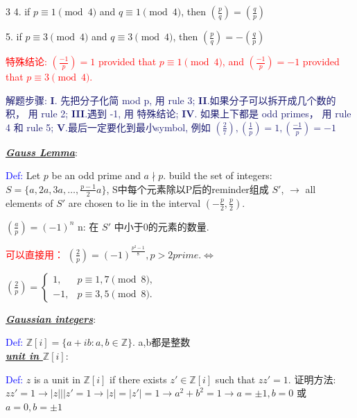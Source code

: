 \documentclass[12pt]{article}
\newcommand{\bulletPoint}[1]{\underline{\textit{\textbf{#1}}}}
\begin{document}
\begin{multicols*}{3}
\textcolor{magenta!90!black}
{4. if $p \equiv 1 \pmod{4}$ and $q \equiv 1 \pmod{4}$, then $\left(\frac{p}{q}\right)=\left(\frac{q}{p}\right)$}

\textcolor{magenta!90!black}
{5. if $p \equiv 3 \pmod{4}$ and $q \equiv 3 \pmod{4}$, then $\left(\frac{p}{q}\right)=-\left(\frac{q}{p}\right)$}

\textcolor{red}{特殊结论: $(\frac{-1}{p})=1$ provided that $p\equiv 1 \pmod{4}$, 
and $(\frac{-1}{p})=-1$ provided that $p\equiv 3 \pmod{4}$.}

{\fontsize{5.5pt}{5pt}\selectfont\textcolor{MidnightBlue}
{解题步骤: \textbf{I}. 先把分子化简 mod p, 用 rule 3;
\textbf{II}.如果分子可以拆开成几个数的积， 用 rule 2;
\textbf{III}.遇到 -1, 用 特殊结论; \textbf{IV}. 如果上下都是 odd primes， 用 rule 4 和 rule 5;
\textbf{V}.最后一定要化到最小symbol, 例如 $(\frac{2}{7}),(\frac{1}{p})=1, (\frac{-1}{p})=-1$}}






\bulletPoint{Gauss Lemma}:

\textcolor{blue}{Def:} Let $p$ be an odd prime and $a \nmid p$. build the set of integers:
$S=\{a, 2a, 3a, \ldots, \frac{p-1}{2}a\}$, S中每个元素除以P后的reminder组成 $S'$,
 $\rightarrow$ all elements of $S'$ are chosen to lie in the interval \textcolor{magenta!90!black}{ $(-\frac{p}{2}, \frac{p}{2})$. }

 \textcolor{magenta!90!black}{$(\frac{a}{p})=(-1)^n$} n: 在 $S'$ 中小于0的元素的数量.

\textcolor{red}{可以直接用：} \textcolor{magenta!90!black}
{$(\frac{2}{p})= (-1)^{\frac{p^2-1}{8}}, p>2 prime. \Longleftrightarrow $}

\textcolor{magenta!90!black} {$\left(\frac{2}{p}\right)
=
\begin{cases}
1, & p \equiv 1,7 \pmod{8},\\
-1, & p \equiv 3,5 \pmod{8}.
\end{cases}$}

\bulletPoint{Gaussian integers}:

\textcolor{blue}{Def:} $\mathbb{Z}[i]=\{a+ib : a,b\in \mathbb{Z}\}.$ a,b都是整数 \\[2pt]


\bulletPoint{unit in $\mathbb{Z}[i]$}:

\textcolor{blue}{Def:} $z$ is a unit in $\mathbb{Z}[i]$ if there exists $z'\in \mathbb{Z}[i]$ such that $zz'=1$. 
证明方法: $zz'=1 \longrightarrow |z|||z'=1 \longrightarrow |z|=|z'|=1 \longrightarrow a^2+b^2=1 \longrightarrow a=\pm 1, b=0$ 或 $a=0, b=\pm 1$


\end{multicols*}
\end{document}
